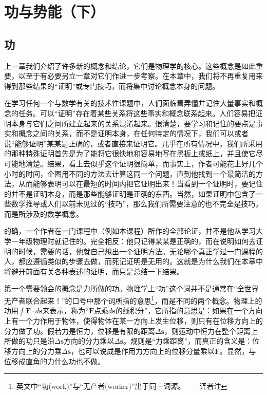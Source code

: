 \chapter{功与势能（下）}

\section{功}

上一章我们介绍了许多新的概念和结论，它们是物理学的核心。这些概念是如此重要，以至于有必要另立一章对它们作进一步考察。在本章中，我们将不再重复用来得到那些结果的“证明”或专门技巧，而将集中讨论概念本身的问题。

在学习任何一个与数学有关的技术性课题中，人们面临着弄懂并记住大量事实和概念的任务。可以“证明”存在着某些关系将这些事实和概念联系起来。人们容易把证明本身与它们之间所建立起来的关系混淆起来。很清楚，要学习和记住的要点是事实和概念之间的关系，而不是证明本身，在任何特定的情况下，我们可以或者说“能够证明”某某是正确的，或者直接来证明它。几乎在所有情况中，我们所采用的那种特殊证明首先是为了能将它很快地和容易地写在黑板上或纸上，并且使它尽可能地清楚。结果，看上去似乎这个证明很简单，而事实上，作者可能花上好几个小时的时间，企图用不同的方法去计算这同一个问题，直到他找到一个最简洁的方法，从而能够表明可以在最短的时间内把它证明出来！当看到一个证明时，要记住的并不是证明本身，而是那些能够证明是正确的东西。当然，如果证明中包含了一些数学推导或人们以前未见过的“技巧”，那么我们所需要注意的也不完全是技巧，而是所涉及的数学概念。

的确，一个作者在一门课程中（例如本课程）所作的全部论证，并不是他从学习大学一年级物理时就记住的。完全相反：他只记得某某是正确的，而在说明如何去证明的时候，需要的话，他就自己想出一个证明方法。无论哪个真正学过一门课程的人，都应遵循类似的步骤去做，而死记证明是无用的。这就是为什么我们在本章中将避开前面有关各种表述的证明，而只是总结一下结果。

第一个需要领会的概念是力所做的功。物理学上“功”这个词并不是通常在“全世界无产者联合起来！”的口号中那个词所指的意思\footnote{英文中“功(work)”与“无产者(worker)”出于同一词源。——译者注}，而是不同的两个概念。物理上的功用$\int \boldsymbol{F}\cdot d\boldsymbol{s}$来表示，称为“$\boldsymbol{F}$点乘$d\boldsymbol{s}$的线积分”，它所指的意思是：如果在一个方向上有一个力作用于物体，使得物体在某一方向上发生位移，则只有在位移方向上的分力做了功。假若力是恒力，位移是有限的距离$\Delta \boldsymbol{s}$，则运动中恒力在整个距离上所做的功只是沿$\Delta \boldsymbol{s}$方向的分力乘以$\Delta \boldsymbol{s}$。规则是“力乘距离”，而真正的含义是：位移方向上的分力乘$\Delta \boldsymbol{s}$，也可以说成是作用力方向上的位移分量乘以$\boldsymbol{F}$。显然，与位移成直角的力什么功也不做。

